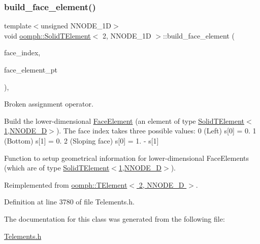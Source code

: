 \subsubsection{\texorpdfstring{build\+\_\+face\+\_\+element()}{build\_face\_element()}}
{\footnotesize\ttfamily template$<$unsigned N\+N\+O\+D\+E\+\_\+1D$>$ \\
void \hyperlink{classoomph_1_1SolidTElement}{oomph\+::\+Solid\+T\+Element}$<$ 2, N\+N\+O\+D\+E\+\_\+1D $>$\+::build\+\_\+face\+\_\+element (\begin{DoxyParamCaption}\item[{const int \&}]{face\+\_\+index,  }\item[{\hyperlink{classoomph_1_1FaceElement}{Face\+Element} $\ast$}]{face\+\_\+element\+\_\+pt }\end{DoxyParamCaption})\hspace{0.3cm}{\ttfamily [inline]}, {\ttfamily [virtual]}}



Broken assignment operator. 

Build the lower-\/dimensional \hyperlink{classoomph_1_1FaceElement}{Face\+Element} (an element of type \hyperlink{classoomph_1_1SolidTElement_3_011_00_01NNODE__1D_01_4}{Solid\+T\+Element$<$1,\+N\+N\+O\+D\+E\+\_\+D$>$}). The face index takes three possible values\+: 0 (Left) s\mbox{[}0\mbox{]} = 0. 1 (Bottom) s\mbox{[}1\mbox{]} = 0. 2 (Sloping face) s\mbox{[}0\mbox{]} = 1. -\/ s\mbox{[}1\mbox{]}

Function to setup geometrical information for lower-\/dimensional Face\+Elements (which are of type \hyperlink{classoomph_1_1SolidTElement_3_011_00_01NNODE__1D_01_4}{Solid\+T\+Element$<$1,\+N\+N\+O\+D\+E\+\_\+D$>$}). 

Reimplemented from \hyperlink{classoomph_1_1TElement_3_012_00_01NNODE__1D_01_4_adf9dd8fa1e2dedc481adfea443e8a926}{oomph\+::\+T\+Element$<$ 2, N\+N\+O\+D\+E\+\_\+D $>$}.



Definition at line 3780 of file Telements.\+h.



The documentation for this class was generated from the following file\+:\begin{DoxyCompactItemize}
\item 
\hyperlink{Telements_8h}{Telements.\+h}\end{DoxyCompactItemize}
